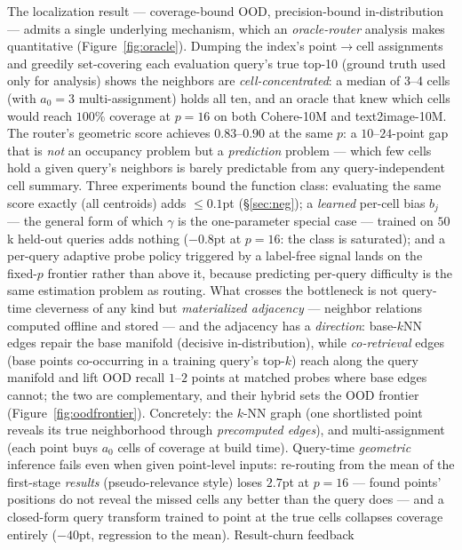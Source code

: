 \documentclass{article}
\begin{document}
The localization result --- coverage-bound OOD, precision-bound in-distribution ---
admits a single underlying mechanism, which an \emph{oracle-router} analysis makes
quantitative (Figure~\ref{fig:oracle}). Dumping the index's point$\to$cell assignments and greedily set-covering
each evaluation query's true top-10 (ground truth used only for analysis) shows the
neighbors are \emph{cell-concentrated}: a median of 3--4 cells (with $a_0{=}3$
multi-assignment) holds all ten, and an oracle that knew which cells would reach
$100\%$ coverage at $p{=}16$ on both Cohere-10M and text2image-10M. The router's
geometric score achieves $0.83$--$0.90$ at the same $p$: a $10$--$24$-point gap that
is \emph{not} an occupancy problem but a \emph{prediction} problem --- which few cells
hold a given query's neighbors is barely predictable from any query-independent cell
summary. Three experiments bound the function class: evaluating the same score exactly
(all centroids) adds $\le\!0.1$pt (\S\ref{sec:neg}); a \emph{learned} per-cell bias
$b_j$ --- the general form of which $\gamma$ is the one-parameter special case ---
trained on $50$k held-out queries adds nothing ($-0.8$pt at $p{=}16$: the class is
saturated); and a per-query adaptive probe policy triggered by a label-free signal
lands on the fixed-$p$ frontier rather than above it, because predicting per-query
difficulty is the same estimation problem as routing. What crosses the bottleneck is not
query-time cleverness of any kind but \emph{materialized adjacency} --- neighbor
relations computed offline and stored --- and the adjacency has a \emph{direction}:
base-$k$NN edges repair the base manifold (decisive in-distribution), while
\emph{co-retrieval} edges (base points co-occurring in a training query's top-$k$)
reach along the query manifold and lift OOD recall $1$--$2$ points at matched probes
where base edges cannot; the two are complementary, and their hybrid sets the OOD
frontier (Figure~\ref{fig:oodfrontier}). Concretely: the $k$-NN graph (one shortlisted point reveals
its true neighborhood through \emph{precomputed edges}), and multi-assignment (each
point buys $a_0$ cells of coverage at build time). Query-time \emph{geometric}
inference fails even when given point-level inputs: re-routing from the mean of the
first-stage \emph{results} (pseudo-relevance style) loses $2.7$pt at $p{=}16$ --- found
points' positions do not reveal the missed cells any better than the query does ---
and a closed-form query transform trained to point at the true cells collapses
coverage entirely ($-40$pt, regression to the mean). Result-churn feedback
\end{document}
